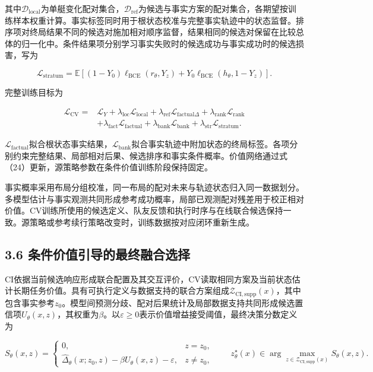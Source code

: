 \documentclass[
  11pt,
  fontset=none]{ctexart}
\begin{document}
其中\(\mathcal D_{\mathrm{local}}\)为单艇变化配对集合，\(\mathcal D_{\mathrm{ref}}\)为候选与事实方案的配对集合，各期望按训练样本权重计算。事实标签同时用于根状态校准与完整事实轨迹中的状态监督。排序项对终局结果不同的候选对施加相对顺序监督，结果相同的候选对保留在比较总体的归一化中。条件结果项分别学习事实失败时的候选成功与事实成功时的候选损害，写为

\[
\mathcal L_{\mathrm{stratum}}
=\mathbb E\!\left[
(1-Y_0)\ell_{\mathrm{BCE}}(r_\theta,Y_z)
+Y_0\ell_{\mathrm{BCE}}(h_\theta,1-Y_z)
\right] .
\tag{23}
\]

完整训练目标为

\[
\begin{aligned}
\mathcal L_{\mathrm{CV}}
={}&\mathcal L_Y
+\lambda_{\mathrm{loc}}\mathcal L_{\mathrm{local}}
+\lambda_{\mathrm{ref}}\mathcal L_{\mathrm{factual}\Delta}
+\lambda_{\mathrm{rank}}\mathcal L_{\mathrm{rank}}\\
&+\lambda_{\mathrm{fact}}\mathcal L_{\mathrm{factual}}
+\lambda_{\mathrm{bank}}\mathcal L_{\mathrm{bank}}
+\lambda_{\mathrm{str}}\mathcal L_{\mathrm{stratum}} .
\end{aligned}
\tag{24}
\]

\(\mathcal L_{\mathrm{factual}}\)拟合根状态事实结果，\(\mathcal L_{\mathrm{bank}}\)拟合事实轨迹中附加状态的终局标签。各项分别约束完整结果、局部相对后果、候选排序和事实条件概率。价值网络通过式（24）更新，源策略参数在条件价值训练阶段保持固定。

事实概率采用布局分组校准，同一布局的配对未来与轨迹状态归入同一数据划分。多模型估计与事实观测共同形成参考成功概率，局部已观测配对残差用于校正相对价值。CV训练所使用的候选定义、队友反馈和执行时序与在线联合候选保持一致。源策略或参考续行策略改变时，训练数据按对应闭环重新生成。

\subsection{3.6
条件价值引导的最终融合选择}\label{ux6761ux4ef6ux4ef7ux503cux5f15ux5bfcux7684ux6700ux7ec8ux878dux5408ux9009ux62e9}

CI依据当前候选响应形成联合配置及其交互评价，CV读取相同方案及当前状态估计长期任务价值。具有可执行定义与数据支持的联合方案组成\(\mathcal Z_{\mathrm{CI,supp}}(x)\)，其中包含事实参考\(z_0\)。模型间预测分歧、配对后果统计及局部数据支持共同形成候选置信项\(U_\theta(x,z)\)，其权重为\(\beta\)。以\(\varepsilon\geq0\)表示价值增益接受阈值，最终决策分数定义为

\[
S_\theta(x,z)=
\begin{cases}
0, & z=z_0,\\
\widehat\Delta_\theta(x;z_0,z)-\beta U_\theta(x,z)-\varepsilon,
& z\ne z_0,
\end{cases}
\qquad
z_\theta^\star(x)\in
\arg\max_{z\in\mathcal Z_{\mathrm{CI,supp}}(x)}S_\theta(x,z) .
\tag{25}
\]
\end{document}
